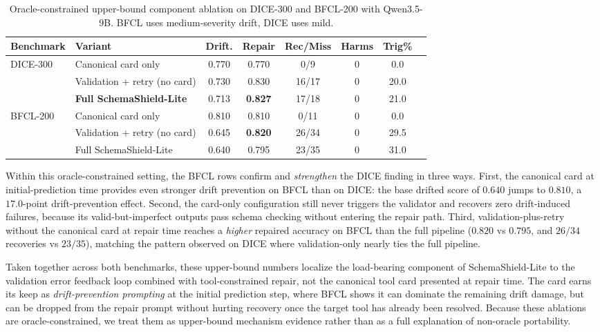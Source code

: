 \documentclass{svproc}
\newcommand{\method}{SchemaShield-Lite\xspace}
\begin{document}
\begin{table}[t]
\caption{Oracle-constrained upper-bound component ablation on DICE-300 and
BFCL-200 with Qwen3.5-9B. BFCL uses medium-severity drift, DICE uses mild.}
\label{tab:component-ablation}
\centering
\small
\begin{tabular}{llcccccc}
\toprule
Benchmark & Variant & Drift. & Repair & Rec/Miss & Harms & Trig\% \\
\midrule
\multirow{3}{*}{DICE-300}
& Canonical card only            & 0.770 & 0.770 & 0/9   & 0 & 0.0 \\
& Validation + retry (no card)   & 0.730 & 0.830 & 16/17 & 0 & 20.0 \\
& \textbf{Full \method}          & 0.713 & \textbf{0.827} & 17/18 & 0 & 21.0 \\
\midrule
\multirow{3}{*}{BFCL-200}
& Canonical card only            & 0.810 & 0.810 & 0/11  & 0 & 0.0 \\
& Validation + retry (no card)   & 0.645 & \textbf{0.820} & 26/34 & 0 & 29.5 \\
& Full \method                   & 0.640 & 0.795 & 23/35 & 0 & 31.0 \\
\bottomrule
\end{tabular}
\end{table}

Within this oracle-constrained setting, the BFCL rows confirm and \emph{strengthen}
the DICE finding in three ways.
First, the canonical card at initial-prediction time provides even stronger
drift prevention on BFCL than on DICE: the base drifted score of $0.640$ jumps
to $0.810$, a $17.0$-point drift-prevention effect. Second, the card-only
configuration still never triggers the validator and recovers zero
drift-induced failures, because its valid-but-imperfect outputs pass schema
checking without entering the repair path. Third, validation-plus-retry
without the canonical card at repair time reaches a \emph{higher} repaired
accuracy on BFCL than the full pipeline ($0.820$ vs $0.795$, and $26/34$
recoveries vs $23/35$), matching the pattern observed on DICE where
validation-only nearly ties the full pipeline.

Taken together across both benchmarks, these upper-bound numbers localize the
load-bearing component of \method to the validation error feedback loop
combined with tool-constrained repair, not the canonical tool card presented at
repair time. The card earns its keep as \emph{drift-prevention prompting}
at the initial prediction step, where BFCL shows it can dominate the
remaining drift damage, but can be dropped from the repair prompt without
hurting recovery once the target tool has already been resolved. Because these
ablations are oracle-constrained, we treat them as upper-bound mechanism evidence
rather than as a full explanation of non-oracle portability.
\end{document}
